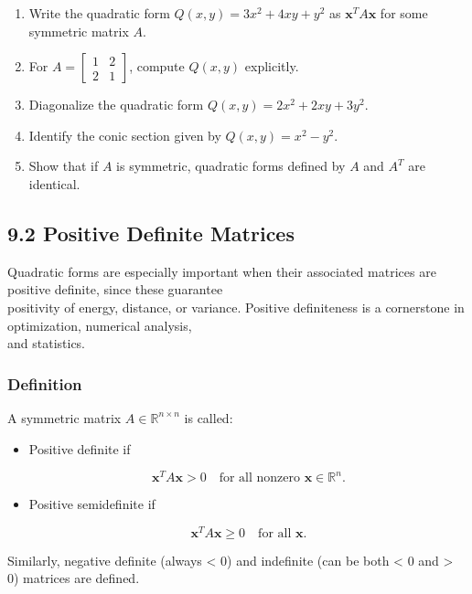 \documentclass[
  12pt,
  a4paper,
]{article}
\begin{document}
\begin{enumerate}
\def\labelenumi{\arabic{enumi}.}
\item
  Write the quadratic form \(Q(x,y) = 3x^2 + 4xy + y^2\) as
  \(\mathbf{x}^T A \mathbf{x}\) for some symmetric matrix \(A\).
\item
  For \(A = \begin{bmatrix} 1 & 2 \\ 2 & 1 \end{bmatrix}\), compute
  \(Q(x,y)\) explicitly.
\item
  Diagonalize the quadratic form \(Q(x,y) = 2x^2 + 2xy + 3y^2\).
\item
  Identify the conic section given by \(Q(x,y) = x^2 - y^2\).
\item
  Show that if \(A\) is symmetric, quadratic forms defined by \(A\) and
  \(A^T\) are identical.
\end{enumerate}

\subsection{9.2 Positive Definite
Matrices}\label{92-positive-definite-matrices}

Quadratic forms are especially important when their associated matrices
are positive definite, since these guarantee\\
positivity of energy, distance, or variance. Positive definiteness is a
cornerstone in optimization, numerical analysis,\\
and statistics.

\subsubsection{Definition}\label{definition-9}

A symmetric matrix \(A \in \mathbb{R}^{n \times n}\) is called:

\begin{itemize}
\item
  Positive definite if

  \[\mathbf{x}^T A \mathbf{x} > 0 \quad \text{for all nonzero } \mathbf{x} \in \mathbb{R}^n.\]
\item
  Positive semidefinite if

  \[\mathbf{x}^T A \mathbf{x} \geq 0 \quad \text{for all } \mathbf{x}.\]
\end{itemize}

Similarly, negative definite (always \textless{} 0) and indefinite (can
be both \textless{} 0 and \textgreater{} 0) matrices are defined.
\end{document}
